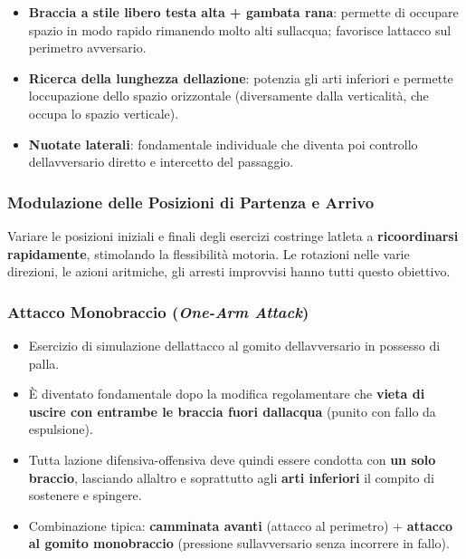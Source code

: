 \documentclass[a4paper,11pt]{article}
\providecommand{\tightlist}{%
  \setlength{\itemsep}{0pt}\setlength{\parskip}{0pt}}
\begin{document}
\begin{itemize}
      \tightlist
      \item
            \textbf{Braccia a stile libero testa alta + gambata rana}: permette di
            occupare spazio in modo rapido rimanendo molto alti
            sull\textquotesingle acqua; favorisce l\textquotesingle attacco sul
            perimetro avversario.
      \item
            \textbf{Ricerca della lunghezza dell\textquotesingle azione}: potenzia
            gli arti inferiori e permette l\textquotesingle occupazione dello
            spazio orizzontale (diversamente dalla verticalità, che occupa lo
            spazio verticale).
      \item
            \textbf{Nuotate laterali}: fondamentale individuale che diventa poi
            controllo dell\textquotesingle avversario diretto e intercetto del
            passaggio.
\end{itemize}

\subsubsection{Modulazione delle Posizioni di Partenza e
      Arrivo}\label{modulazione-delle-posizioni-di-partenza-e-arrivo}

Variare le posizioni iniziali e finali degli esercizi costringe
l\textquotesingle atleta a \textbf{ricoordinarsi rapidamente},
stimolando la flessibilità motoria. Le rotazioni nelle varie direzioni,
le azioni aritmiche, gli arresti improvvisi hanno tutti questo
obiettivo.

\subsubsection{\texorpdfstring{Attacco Monobraccio (\emph{One-Arm
                  Attack})}{Attacco Monobraccio (One-Arm Attack)}}\label{attacco-monobraccio-one-arm-attack}

\begin{itemize}
      \tightlist
      \item
            Esercizio di simulazione dell\textquotesingle attacco al gomito
            dell\textquotesingle avversario in possesso di palla.
      \item
            È diventato fondamentale dopo la modifica regolamentare che
            \textbf{vieta di uscire con entrambe le braccia fuori
                  dall\textquotesingle acqua} (punito con fallo da espulsione).
      \item
            Tutta l\textquotesingle azione difensiva-offensiva deve quindi essere
            condotta con \textbf{un solo braccio}, lasciando
            all\textquotesingle altro e soprattutto agli \textbf{arti inferiori}
            il compito di sostenere e spingere.
      \item
            Combinazione tipica: \textbf{camminata avanti} (attacco al perimetro)
            + \textbf{attacco al gomito monobraccio} (pressione
            sull\textquotesingle avversario senza incorrere in fallo).
\end{itemize}
\end{document}
